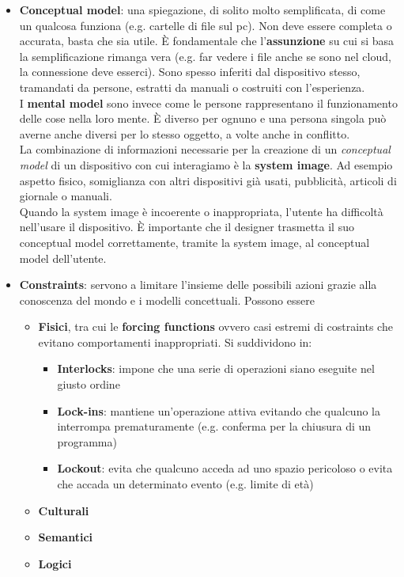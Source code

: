 \begin{itemize}
	\item \textbf{Conceptual model}: una spiegazione, di solito molto semplificata, di come un qualcosa funziona (e.g. cartelle di file sul pc). Non deve essere completa o accurata, basta che sia utile. È fondamentale che l'\textbf{assunzione} su cui si basa la semplificazione rimanga vera (e.g. far vedere i file anche se sono nel cloud, la connessione deve esserci). Sono spesso inferiti dal dispositivo stesso, tramandati da persone, estratti da manuali o costruiti con l'esperienza.\\
	I \textbf{mental model} sono invece come le persone rappresentano il funzionamento delle cose nella loro mente. È diverso per ognuno e una persona singola può averne anche diversi per lo stesso oggetto, a volte anche in conflitto.\\
	La combinazione di informazioni necessarie per la creazione di un \textit{conceptual model} di un dispositivo con cui interagiamo è la \textbf{system image}. Ad esempio aspetto fisico, somiglianza con altri dispositivi già usati, pubblicità, articoli di giornale o manuali.\\
	Quando la system image è incoerente o inappropriata, l'utente ha difficoltà nell'usare il dispositivo. È importante che il designer trasmetta il suo conceptual model correttamente, tramite la system image, al conceptual model dell'utente.
	
	\item \textbf{Constraints}: servono a limitare l'insieme delle possibili azioni grazie alla conoscenza del mondo e i modelli concettuali. Possono essere
	\begin{itemize}
		\item \textbf{Fisici}, tra cui le \textbf{forcing functions} ovvero casi estremi di costraints che evitano comportamenti inappropriati. Si suddividono in:
		\begin{itemize}
			\item \textbf{Interlocks}: impone che una serie di operazioni siano eseguite nel giusto ordine
			\item \textbf{Lock-ins}: mantiene un'operazione attiva evitando che qualcuno la interrompa prematuramente (e.g. conferma per la chiusura di un programma)
			\item \textbf{Lockout}: evita che qualcuno acceda ad uno spazio pericoloso o evita che accada un determinato evento (e.g. limite di età)
		\end{itemize}
		\item \textbf{Culturali}
		\item \textbf{Semantici}
		\item \textbf{Logici}
	\end{itemize}
\end{itemize}

